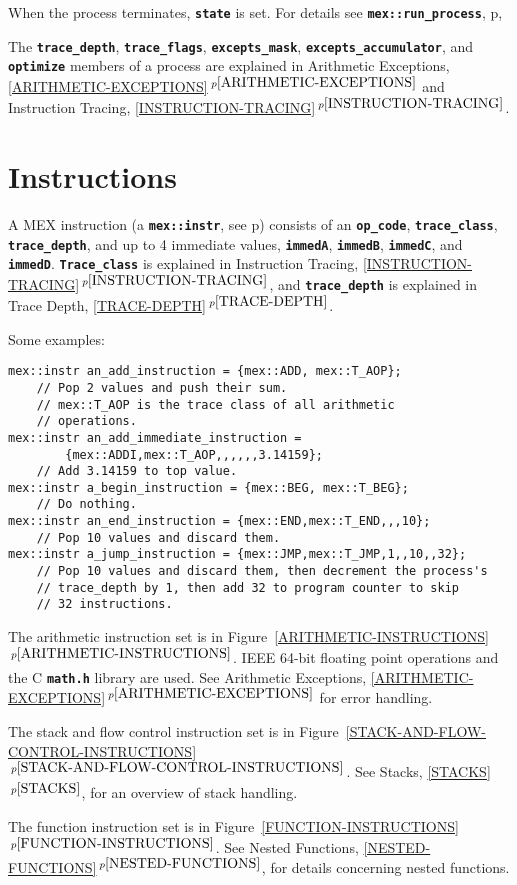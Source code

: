 \documentclass[12pt]{article}
\newcommand{\TT}[1]{{\tt \bfseries #1}}
\newcommand{\itemref}[1]{\ref{#1}$\,^{p\pageref{#1}}$}
\newcommand{\pagref}[1]{p\pageref{#1}}
\newcommand{\EOL}{\penalty \exhyphenpenalty}
\newenvironment{indpar}[1][0.3in]%
	{\begin{list}{}%
		     {\setlength{\itemsep}{0in}%
		      \setlength{\topsep}{0in}%
		      \setlength{\parsep}{1ex}%
		      \setlength{\labelwidth}{#1}%
		      \setlength{\leftmargin}{#1}%
		      \addtolength{\leftmargin}{\labelsep}}%
	 \item}%
	{\end{list}}
\begin{document}
When the process terminates, \TT{state} is set.  For details
see \TT{mex::run\_process}, \pagref{MEX::RUN_PROCESS},

The \TT{trace\_depth}, \TT{trace\_flags}, \TT{excepts\_mask},
\TT{excepts\_accumulator}, and \TT{optimize}
members of a process
are explained in Arithmetic Exceptions, \itemref{ARITHMETIC-EXCEPTIONS}
and Instruction Tracing, \itemref{INSTRUCTION-TRACING}.


\section{Instructions}
\label{INSTRUCTIONS}

A MEX instruction (a \TT{mex::instr}, see \pagref{MEX::INSTR})
consists of an \TT{op\_code}, \TT{trace\_class}, \TT{trace\_\EOL depth},
and up to 4 immediate values,
\TT{immedA}, \TT{immedB}, \TT{immedC}, and \TT{immedD}.
\TT{Trace\_class} is explained in Instruction Tracing,
\itemref{INSTRUCTION-TRACING}, and
\TT{trace\_depth} is explained in Trace Depth,
\itemref{TRACE-DEPTH}.

Some examples:
\begin{indpar}\begin{verbatim}
mex::instr an_add_instruction = {mex::ADD, mex::T_AOP};
    // Pop 2 values and push their sum.
    // mex::T_AOP is the trace class of all arithmetic
    // operations.
mex::instr an_add_immediate_instruction =
        {mex::ADDI,mex::T_AOP,,,,,,3.14159};
    // Add 3.14159 to top value.
mex::instr a_begin_instruction = {mex::BEG, mex::T_BEG};
    // Do nothing.
mex::instr an_end_instruction = {mex::END,mex::T_END,,,10};
    // Pop 10 values and discard them.
mex::instr a_jump_instruction = {mex::JMP,mex::T_JMP,1,,10,,32};
    // Pop 10 values and discard them, then decrement the process's
    // trace_depth by 1, then add 32 to program counter to skip
    // 32 instructions.
\end{verbatim}\end{indpar}

The arithmetic instruction set is in Figure~\itemref{ARITHMETIC-INSTRUCTIONS}.
IEEE 64-bit floating point operations and the C \TT{math.h}
library are used.  See Arithmetic Exceptions,
\itemref{ARITHMETIC-EXCEPTIONS} for error
handling.

The stack and flow control instruction set is in
Figure~\itemref{STACK-AND-FLOW-CONTROL-INSTRUCTIONS}.
See Stacks, \itemref{STACKS}, for an overview of stack handling.

The function instruction set is in
Figure~\itemref{FUNCTION-INSTRUCTIONS}.
See Nested Functions, \itemref{NESTED-FUNCTIONS},
for details concerning nested functions.
\end{document}
